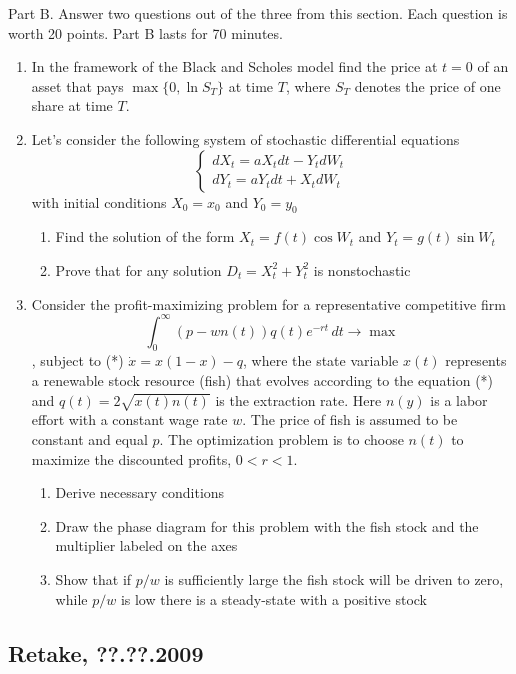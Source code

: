 \documentclass[pdftex,12pt,a4paper]{article}
\begin{document}
Part B.
Answer two questions out of the three from this section. Each question is worth 20 points.
Part B lasts for 70 minutes.
\begin{enumerate}
\item  In the framework of the Black and Scholes model find the price at $t=0$ of an asset that pays $\max\{0,\ln S_T\}$  at time $T$, where $S_T$ denotes the price of one share at time $T$.

\item Let’s consider the following system of stochastic differential equations
\[
\left\{
  \begin{array}{l}
    dX_t=aX_t dt-Y_t dW_t \\
    dY_t=aY_t dt+X_t dW_t
  \end{array}
\right.
\]
with initial conditions $X_0=x_0$ and $Y_0=y_0$ 
\begin{enumerate}
\item Find the solution of the form $X_t=f(t)\cos W_t$ and $Y_t=g(t)\sin W_t$ 
\item Prove that for any solution $D_t=X_t^2+Y_t^2$ is nonstochastic
\end{enumerate}


\item Consider the profit-maximizing problem for a representative competitive firm 
\[
\int_0^{\infty} (p-wn(t))q(t)e^{-rt}\, dt \to \max
\]
, subject to (*) $\dot{x}=x(1-x)-q$, where the state variable $x(t)$ represents a renewable stock resource (fish) that evolves according to the equation (*) and $q(t)=2\sqrt{x(t)n(t)}$ is the extraction rate. Here $n(y)$ is a labor effort with a constant wage rate $w$. The price of fish is assumed to be constant and equal $p$.  The optimization problem is to choose $n(t)$ to maximize the discounted profits, $0<r<1$.
\begin{enumerate}
\item Derive necessary conditions
\item Draw the phase diagram for this problem with the fish stock and the multiplier labeled on the axes
\item Show that if $p/w$ is sufficiently large the fish stock will be driven to zero, while $p/w$ is low there is a steady-state with a positive stock
\end{enumerate}
\end{enumerate}



\subsection{Retake, ??.??.2009}
\end{document}
